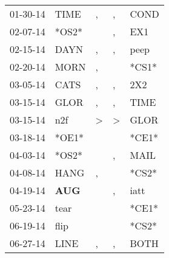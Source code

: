 \begin{supertabular}{p{0.07\textwidth}p{0.06\textwidth}p{0.02\textwidth}p{0.02\textwidth}p{0.06\textwidth}}
          01-30-14\textsuperscript{} &           TIME\textsuperscript{} &                , &                , &           COND\textsuperscript{} \\
          02-07-14\textsuperscript{} &                            *OS2* &                  &                , &            EX1\textsuperscript{} \\
          02-15-14\textsuperscript{} &           DAYN\textsuperscript{} &                , &                , &           peep\textsuperscript{} \\
          02-20-14\textsuperscript{} &           MORN\textsuperscript{} &                , &                  &                            *CS1* \\
          03-05-14\textsuperscript{} &           CATS\textsuperscript{} &                , &                , &            2X2\textsuperscript{} \\
          03-15-14\textsuperscript{} &           GLOR\textsuperscript{} &                , &                , &           TIME\textsuperscript{} \\
          03-15-14\textsuperscript{} &            n2f\textsuperscript{} &     \textgreater &     \textgreater &           GLOR\textsuperscript{} \\
          03-18-14\textsuperscript{} &                            *OE1* &                  &                  &                            *CE1* \\
          04-03-14\textsuperscript{} &                            *OS2* &                  &                , &           MAIL\textsuperscript{} \\
          04-08-14\textsuperscript{} &           HANG\textsuperscript{} &                , &                  &                            *CS2* \\
          04-19-14\textsuperscript{} &   \textbf{AUG\textsuperscript{}} &                  &                , &           iatt\textsuperscript{} \\
          05-23-14\textsuperscript{} &           tear\textsuperscript{} &                  &                  &                            *CE1* \\
          06-19-14\textsuperscript{} &           flip\textsuperscript{} &                  &                  &                            *CS2* \\
          06-27-14\textsuperscript{} &           LINE\textsuperscript{} &                , &                , &           BOTH\textsuperscript{} \\

\end{supertabular}

